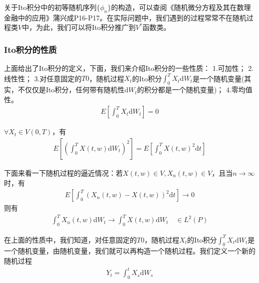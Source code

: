             \par
            关于Ito积分中的初等随机序列$\{\phi_n\}$的构造，可以查阅《随机微分方程及其在数理金融中的应用》蒲兴成P16-P17。在实际问题中，我们遇到的过程常常不在随机过程类$V$中，为此，我们可以将Ito积分推广到$V^*$函数类。

        \subsubsection{Ito积分的性质}
            \par
            上面给出了Ito积分的定义，下面，我们来介绍Ito积分的一些性质：
            1.可加性；
            2.线性性；
            3.对任意固定的$T0$，随机过程$X_t$的Ito积分$\int_0^T X_t \mathrm{d}W_t$是一个随机变量(其实，不仅仅是Ito积分，任何带有随机性$\mathrm{d}W_t$的积分都是一个随机变量)；
            4.零均值性。
            \begin{align*}
                E\left[ \int_0^T X_t \mathrm{d}W_t\right] = 0
            \end{align*}
            \begin{lemma}[Ito引理]
            $\forall X_t \in V(0,T)$，有
            \begin{align*}
                E\left[ \left( \int_0^T X(t,w) \mathrm{d}W_t \right)^2 \right] =
                E\left[  \int_0^T X(t,w)^2 \mathrm{d}t \right]
            \end{align*}
            \end{lemma}
            \par
            下面来看一下随机过程的逼近情况：若$X(t,w)\in V,X_n(t,w)\in V$，且当$n\rightarrow \infty$时，有
            \begin{align*}
                E\left[ \int_0^T ( X_n(t,w) - X(t,w) )^2\mathrm{d}t \right] \rightarrow 0
            \end{align*}
            则有
            \begin{align*}
                \int_0^T X_n(t,w) \mathrm{d}W_t \rightarrow \int_0^T X(t,w) \mathrm{d}W_t \quad \in L^2(P)
            \end{align*}
            \par
            在上面的性质中，我们知道，对任意固定的$T0$，随机过程$X_t$的Ito积分$\int_0^T X_t \mathrm{d}W_t$是一个随机变量，由随机变量，我们就可以再构造一个随机过程。我们定义一个新的随机过程
            \begin{align*}
                Y_t = \int_0^t X_s \mathrm{d}W_s
            \end{align*}
